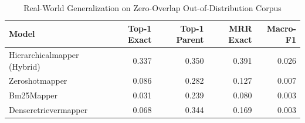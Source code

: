 \begin{table}[t]
\centering
\caption{Real-World Generalization on Zero-Overlap Out-of-Distribution Corpus}
\label{tab:external}
\begin{tabular}{lrrrr}
\toprule
Model & Top-1 Exact & Top-1 Parent & MRR Exact & Macro-F1 \\ \midrule
Hierarchicalmapper (Hybrid) & 0.337 & 0.350 & 0.391 & 0.026 \\
Zeroshotmapper & 0.086 & 0.282 & 0.127 & 0.007 \\
Bm25Mapper & 0.031 & 0.239 & 0.080 & 0.003 \\
Denseretrievermapper & 0.068 & 0.344 & 0.169 & 0.003 \\
\bottomrule
\end{tabular}
\end{table}